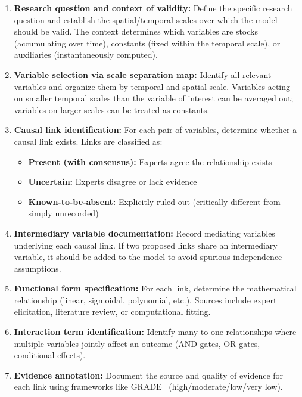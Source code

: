\begin{enumerate}
    \item \textbf{Research question and context of validity:} Define the specific research question and establish the spatial/temporal scales over which the model should be valid. The context determines which variables are stocks (accumulating over time), constants (fixed within the temporal scale), or auxiliaries (instantaneously computed).
    \item \textbf{Variable selection via scale separation map:} Identify all relevant variables and organize them by temporal and spatial scale. Variables acting on smaller temporal scales than the variable of interest can be averaged out; variables on larger scales can be treated as constants.
    \item \textbf{Causal link identification:} For each pair of variables, determine whether a causal link exists. Links are classified as:
    \begin{itemize}
        \item \textbf{Present (with consensus):} Experts agree the relationship exists
        \item \textbf{Uncertain:} Experts disagree or lack evidence
        \item \textbf{Known-to-be-absent:} Explicitly ruled out (critically different from simply unrecorded)
    \end{itemize}
    \item \textbf{Intermediary variable documentation:} Record mediating variables underlying each causal link. If two proposed links share an intermediary variable, it should be added to the model to avoid spurious independence assumptions.
    \item \textbf{Functional form specification:} For each link, determine the mathematical relationship (linear, sigmoidal, polynomial, etc.). Sources include expert elicitation, literature review, or computational fitting.
    \item \textbf{Interaction term identification:} Identify many-to-one relationships where multiple variables jointly affect an outcome (AND gates, OR gates, conditional effects).
    \item \textbf{Evidence annotation:} Document the source and quality of evidence for each link using frameworks like GRADE~\citep{moberg2018grade} (high/moderate/low/very low).
\end{enumerate}

